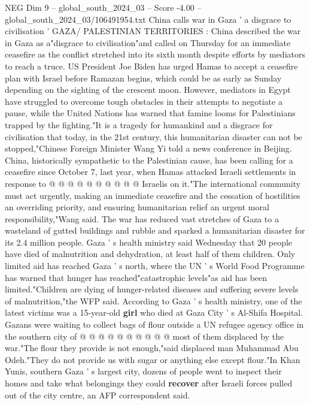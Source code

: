 \begin{textsample}{NEG Dim 9 – global\_south\_2024\_03 – Score -4.00 – global\_south\_2024\_03/106491954.txt}  \label{ex:f9_neg_373}
China calls war in Gaza ' a disgrace to civilisation ' GAZA/ PALESTINIAN TERRITORIES : China described the war in Gaza as a"disgrace to civilisation"and called on Thursday for an immediate ceasefire as the conflict stretched into its sixth month despite efforts by mediators to reach a truce.
US President Joe Biden has urged Hamas to accept a ceasefire plan with Israel before Ramazan begins, which could be as early as Sunday depending on the sighting of the crescent moon.
However, mediators in Egypt have struggled to overcome tough obstacles in their attempts to negotiate a pause, while the United Nations has warned that famine looms for Palestinians trapped by the fighting."It is a tragedy for humankind and a disgrace for civilisation that today, in the 21st century, this humanitarian disaster can not be stopped,"Chinese Foreign Minister Wang Yi told a news conference in Beijing.
China, historically sympathetic to the Palestinian cause, has been calling for a ceasefire since October 7, last year, when Hamas attacked Israeli settlements in response to @ @ @ @ @ @ @ @ @ @ Israelis on it."The international community must act urgently, making an immediate ceasefire and the cessation of hostilities an overriding priority, and ensuring humanitarian relief an urgent moral responsibility,"Wang said.
The war has reduced vast stretches of Gaza to a wasteland of gutted buildings and rubble and sparked a humanitarian disaster for its 2.4 million people.
Gaza ' s health ministry said Wednesday that 20 people have died of malnutrition and dehydration, at least half of them children.
Only limited aid has reached Gaza ' s north, where the UN ' s World Food Programme has warned that hunger has reached"catastrophic levels"as aid has been limited."Children are dying of hunger-related diseases and suffering severe levels of malnutrition,"the WFP said.
According to Gaza ' s health ministry, one of the latest victims was a 15-year-old \textbf{girl} who died at Gaza City ' s Al-Shifa Hospital.
Gazans were waiting to collect bags of flour outside a UN refugee agency office in the southern city of @ @ @ @ @ @ @ @ @ @ most of them displaced by the war."The flour they provide is not enough,"said displaced man Muhammad Abu Odeh."They do not provide us with sugar or anything else except flour."In Khan Yunis, southern Gaza ' s largest city, dozens of people went to inspect their homes and take what belongings they could \textbf{recover} after Israeli forces pulled out of the city centre, an AFP correspondent said.

\end{textsample}
